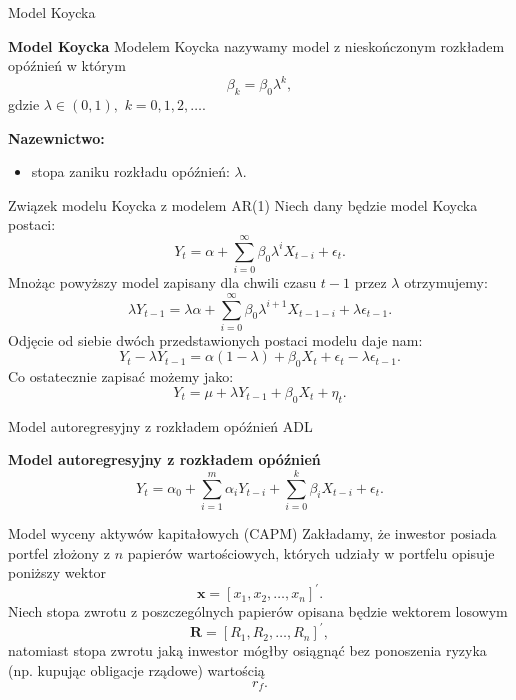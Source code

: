 \documentclass[a4paper, 11pt]{beamer}
\begin{document}
	\begin{frame}{Model Koycka}
		\begin{block}{\textbf{Model Koycka}}
			Modelem Koycka nazywamy model z nieskończonym rozkładem opóźnień w
			którym \[
				\beta_{k} = \beta_{0} \lambda^{k},
			\] gdzie $\lambda \in \left(0, 1\right),$ $k = 0, 1, 2, \ldots.$
		\end{block}
		\textbf{Nazewnictwo:}
		\begin{itemize}
			\item stopa zaniku rozkładu opóźnień: $\lambda.$
		\end{itemize}
	\end{frame}
	
	\begin{frame}{Związek modelu Koycka z modelem AR(1)}
		Niech dany będzie model Koycka postaci: \[
			Y_{t} = \alpha + \sum_{i=0}^{\infty} \beta_{0} \lambda^{i} X_{t-i} + 
				\epsilon_{t}.
		\] Mnożąc powyższy model zapisany dla chwili czasu $t-1$ przez $\lambda$ 
			otrzymujemy: \[
			\lambda Y_{t-1} =
				\lambda \alpha +
				\sum_{i=0}^{\infty} \beta_{0} \lambda^{i+1} X_{t-1-i} + 
				\lambda \epsilon_{t-1}.
		\] Odjęcie od siebie dwóch przedstawionych postaci modelu daje nam: \[
			Y_{t} - \lambda Y_{t-1} = \alpha\left(1 - \lambda\right) +
				\beta_{0} X_{t} + \epsilon_{t} - \lambda \epsilon_{t-1}.
		\] Co ostatecznie zapisać możemy jako: \[
			Y_{t} = \mu + \lambda Y_{t-1} + \beta_{0} X_{t} + \eta_{t}.
		\]
	\end{frame}
	
	\begin{frame}{Model autoregresyjny z rozkładem opóźnień ADL}
		\begin{block}{\textbf{Model autoregresyjny z rozkładem opóźnień}} \[
				Y_{t} = \alpha_{0}
					+ \sum_{i=1}^{m} \alpha_{i} Y_{t-i}
					+ \sum_{i=0}^{k} \beta_{i} X_{t-i}
					+ \epsilon_{t}.
			\]
		\end{block}
	\end{frame}
	
	\begin{frame}{Model wyceny aktywów kapitałowych (CAPM)}
		Zakładamy, że inwestor posiada portfel złożony z $n$ papierów wartościowych,
		których udziały w portfelu opisuje poniższy wektor \[
			\boldsymbol{x} = \left[x_1, x_2, \ldots, x_n\right]^{\prime}.
		\]
		Niech stopa zwrotu z poszczególnych papierów opisana będzie wektorem losowym \[
			\boldsymbol{R} = \left[R_1, R_2, \ldots, R_n\right]^{\prime},
		\] natomiast stopa zwrotu jaką inwestor mógłby osiągnąć bez ponoszenia ryzyka
		(np. kupując obligacje rządowe) wartością \[
			r_f.
		\]
	\end{frame}
	
\end{document}
